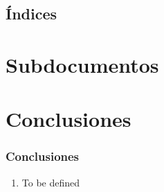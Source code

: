 \documentclass[a4paper,slidestop,xcolor=pst,dvips,blue]{beamer}
\begin{document}
\subsection{Índices}

\section{Subdocumentos}

\section{Conclusiones}

\begin{frame}[c]
	\frametitle{Conclusiones}
	\begin{enumerate}[<+->]
		\item To be defined
	\end{enumerate}
\end{frame}

%    
%    
\end{document}
